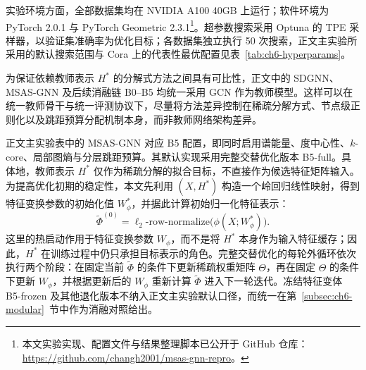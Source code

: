 实验环境方面，全部数据集均在 NVIDIA A100 40GB 上运行；软件环境为 PyTorch 2.0.1 与 PyTorch Geometric 2.3.1\footnote{本文实验实现、配置文件与结果整理脚本已公开于 GitHub 仓库：\url{https://github.com/changh2001/msas-gnn-repro}。}。超参数搜索采用 Optuna 的 TPE 采样器\cite{Akiba2019Optuna,Bergstra2011TPE}，以验证集准确率为优化目标；各数据集独立执行 50 次搜索，正文主实验所采用的默认搜索范围与 Cora 上的代表性最优配置见表~\ref{tab:ch6-hyperparams}。

为保证依赖教师表示 $H^*$ 的分解式方法之间具有可比性，正文中的 SDGNN、MSAS-GNN 及后续消融链 B0--B5 均统一采用 GCN 作为教师模型。这样可以在统一教师骨干与统一评测协议下，尽量将方法差异控制在稀疏分解方式、节点级正则化以及跳距预算分配机制本身，而非教师网络架构差异。

正文主实验表中的 MSAS-GNN 对应 B5 配置，即同时启用谱能量、度中心性、$k$-core、局部图熵与分层跳距预算。其默认实现采用完整交替优化版本 B5-full。具体地，教师表示 $H^*$ 仅作为稀疏分解的拟合目标，不直接作为候选特征矩阵输入。为提高优化初期的稳定性，本文先利用 $(X,H^*)$ 构造一个岭回归线性映射，得到特征变换参数的初始化值 $W_\phi^*$，并据此计算初始归一化特征表示：
\begin{equation}
  \tilde{\Phi}^{(0)}
  =
  \ell_2\text{-row-normalize}\bigl(\phi(X;W_\phi^*)\bigr).
  \label{eq:ch6-phi-warmstart}
\end{equation}
这里的热启动作用于特征变换参数 $W_\phi$，而不是将 $H^*$ 本身作为输入特征缓存；因此，$H^*$ 在训练过程中仍只承担目标表示的角色。完整交替优化的每轮外循环依次执行两个阶段：在固定当前 $\tilde{\Phi}$ 的条件下更新稀疏权重矩阵 $\Theta$，再在固定 $\Theta$ 的条件下更新 $W_\phi$，并根据更新后的 $W_\phi$ 重新计算 $\tilde{\Phi}$ 进入下一轮迭代。冻结特征变体 B5-frozen 及其他退化版本不纳入正文主实验默认口径，而统一在第~\ref{subsec:ch6-modular}~节中作为消融对照给出。

